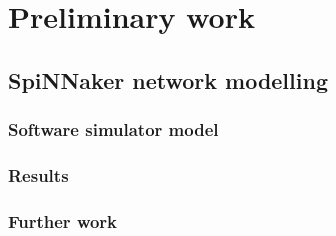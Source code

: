 \chapter{Preliminary work}
	\label{sec:preliminary-work}
	
	
	\section{SpiNNaker network modelling}
		
		
		\subsection{Software simulator model}
			
		
		\subsection{Results}
			
		
		\subsection{Further work}
			
	
